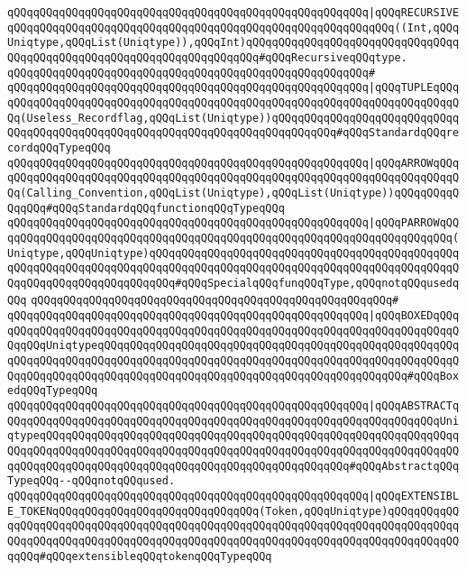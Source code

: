 \verb|qQQqqQQqqQQqqQQqqQQqqQQqqQQqqQQqqQQqqQQqqQQqqQQqqQQqqQQq|\verb#|qQQqRECURSIVEqQQqqQQqqQQqqQQqqQQqqQQqqQQqqQQqqQQqqQQqqQQqqQQqqQQqqQQqqQQq((Int,qQQqUniqtype,qQQqList(Uniqtype)),qQQqInt)qQQqqQQqqQQqqQQqqQQqqQQqqQQqqQQqqQQqqQQqqQQqqQQqqQQqqQQqqQQqqQQqqQQqqQQq#\verb|#qQQqRecursiveqQQqtype.|\newline
\verb|qQQqqQQqqQQqqQQqqQQqqQQqqQQqqQQqqQQqqQQqqQQqqQQqqQQqqQQq#|\newline
\verb|qQQqqQQqqQQqqQQqqQQqqQQqqQQqqQQqqQQqqQQqqQQqqQQqqQQqqQQq|\verb#|qQQqTUPLEqQQqqQQqqQQqqQQqqQQqqQQqqQQqqQQqqQQqqQQqqQQqqQQqqQQqqQQqqQQqqQQqqQQqqQQqqQQq(Useless_Recordflag,qQQqList(Uniqtype))qQQqqQQqqQQqqQQqqQQqqQQqqQQqqQQqqQQqqQQqqQQqqQQqqQQqqQQqqQQqqQQqqQQqqQQqqQQqqQQq#\verb|#qQQqStandardqQQqrecordqQQqTypeqQQq|\newline
\verb|qQQqqQQqqQQqqQQqqQQqqQQqqQQqqQQqqQQqqQQqqQQqqQQqqQQqqQQq|\verb#|qQQqARROWqQQqqQQqqQQqqQQqqQQqqQQqqQQqqQQqqQQqqQQqqQQqqQQqqQQqqQQqqQQqqQQqqQQqqQQqqQQq(Calling_Convention,qQQqList(Uniqtype),qQQqList(Uniqtype))qQQqqQQqqQQqqQQq#\verb|#qQQqStandardqQQqfunctionqQQqTypeqQQq|\newline
\verb|qQQqqQQqqQQqqQQqqQQqqQQqqQQqqQQqqQQqqQQqqQQqqQQqqQQqqQQq|\verb#|qQQqPARROWqQQqqQQqqQQqqQQqqQQqqQQqqQQqqQQqqQQqqQQqqQQqqQQqqQQqqQQqqQQqqQQqqQQqqQQq(Uniqtype,qQQqUniqtype)qQQqqQQqqQQqqQQqqQQqqQQqqQQqqQQqqQQqqQQqqQQqqQQqqQQqqQQqqQQqqQQqqQQqqQQqqQQqqQQqqQQqqQQqqQQqqQQqqQQqqQQqqQQqqQQqqQQqqQQqqQQqqQQqqQQqqQQqqQQqqQQq#\verb|#qQQqSpecialqQQqfunqQQqType,qQQqnotqQQqusedqQQq|\newline
\verb|qQQqqQQqqQQqqQQqqQQqqQQqqQQqqQQqqQQqqQQqqQQqqQQqqQQqqQQq#|\newline
\verb|qQQqqQQqqQQqqQQqqQQqqQQqqQQqqQQqqQQqqQQqqQQqqQQqqQQqqQQq|\verb#|qQQqBOXEDqQQqqQQqqQQqqQQqqQQqqQQqqQQqqQQqqQQqqQQqqQQqqQQqqQQqqQQqqQQqqQQqqQQqqQQqqQQqqQQqUniqtypeqQQqqQQqqQQqqQQqqQQqqQQqqQQqqQQqqQQqqQQqqQQqqQQqqQQqqQQqqQQqqQQqqQQqqQQqqQQqqQQqqQQqqQQqqQQqqQQqqQQqqQQqqQQqqQQqqQQqqQQqqQQqqQQqqQQqqQQqqQQqqQQqqQQqqQQqqQQqqQQqqQQqqQQqqQQqqQQqqQQqqQQqqQQq#\verb|#qQQqBoxedqQQqTypeqQQq|\newline
\verb|qQQqqQQqqQQqqQQqqQQqqQQqqQQqqQQqqQQqqQQqqQQqqQQqqQQqqQQq|\verb#|qQQqABSTRACTqQQqqQQqqQQqqQQqqQQqqQQqqQQqqQQqqQQqqQQqqQQqqQQqqQQqqQQqqQQqqQQqqQQqUniqtypeqQQqqQQqqQQqqQQqqQQqqQQqqQQqqQQqqQQqqQQqqQQqqQQqqQQqqQQqqQQqqQQqqQQqqQQqqQQqqQQqqQQqqQQqqQQqqQQqqQQqqQQqqQQqqQQqqQQqqQQqqQQqqQQqqQQqqQQqqQQqqQQqqQQqqQQqqQQqqQQqqQQqqQQqqQQqqQQqqQQqqQQqqQQq#\verb|#qQQqAbstractqQQqTypeqQQq--qQQqnotqQQqused.|\newline
\verb|qQQqqQQqqQQqqQQqqQQqqQQqqQQqqQQqqQQqqQQqqQQqqQQqqQQqqQQq|\verb#|qQQqEXTENSIBLE_TOKENqQQqqQQqqQQqqQQqqQQqqQQqqQQqqQQq(Token,qQQqUniqtype)qQQqqQQqqQQqqQQqqQQqqQQqqQQqqQQqqQQqqQQqqQQqqQQqqQQqqQQqqQQqqQQqqQQqqQQqqQQqqQQqqQQqqQQqqQQqqQQqqQQqqQQqqQQqqQQqqQQqqQQqqQQqqQQqqQQqqQQqqQQqqQQqqQQqqQQqqQQq#\verb|#qQQqextensibleqQQqtokenqQQqTypeqQQq|\newline

